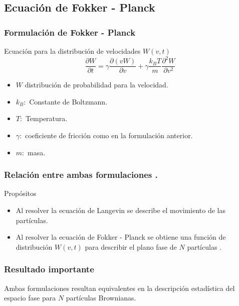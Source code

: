 \subsection{Ecuación de Fokker - Planck}
\begin{frame}
  \frametitle{Formulación de Fokker - Planck}
  \begin{exampleblock}{Ecuación para la distribución de velocidades $W(v,t)$}
   \begin{equation*}\label{eqn:EDPDisttribution}
      \frac{\partial W}{\partial t }=\gamma \frac{\partial(vW)}{\partial v}
      +\gamma \frac{k _BT}{m} \frac{\partial ^2 W}{\partial v^2}
    \end{equation*}
  \end{exampleblock}
  \begin{itemize}
    \item
      $W$ distribución de probabilidad para la velocidad.
    \item
      $k_B:$ Constante de Boltzmann.
    \item
      $T:$ Temperatura.
    \item
      $\gamma:$  coeficiente de fricción como en la formulación anterior.
    \item
      $m:$ masa.
  \end{itemize}
\end{frame}
\begin{bibunit}[aalpha] 
  \begin{frame}
    \frametitle{Relación entre ambas formulaciones \cite{Risk88:FokkeEquatMethoSolutAppli}.}
    \begin{alertblock}{Propósitos}
      \begin{itemize}
        \item
          Al resolver la ecuación de Langevin se describe el movimiento  de las partículas.
        \item
          Al resolver la ecuación de Fokker - Planck se obtiene una función de
          distribución $W(v,t)$ para describir el plano fase de $N$ partículas .
      \end{itemize}
      \end{alertblock}
  \end{frame}
\end{bibunit}
\begin{bibunit}[aalpha]
  \begin{frame}
    \frametitle{Resultado importante}
    \begin{exampleblock}{Ambas formulaciones resultan equivalentes}
      en la descripción estadística del espacio fase para $N$ partículas Brownianas.
      \cite{ErmakMcCammon}
    \end{exampleblock}
  \end{frame}
\end{bibunit}
